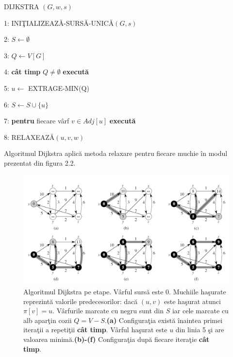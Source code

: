 \documentclass[11pt,a4paper]{report}
\begin{document}
    
    \vspace{0.3cm}
    DIJKSTRA $(G,w,s)$
    
    \vspace{0.1cm}
    1: INI\c TIALIZEAZ\u A-SURS\u A-UNIC\u A$(G,s)$
    
    2: $S\longleftarrow \emptyset$  
    
    3: $Q\longleftarrow V[G]$
    
    4: \textbf{c\^ at timp} $Q\ne \emptyset$ \textbf{execut\u a}
    
    5:\hspace{0.6cm} $u\longleftarrow$ EXTRAGE-MIN(Q)
    
    6:\hspace{0.6cm} $S\longleftarrow S\cup \{u\}$
    
    7:\hspace{0.6cm} \textbf{pentru} fiecare v\^ arf $v\in Adj[u]$ \textbf{execut\u a}
    
    8:\hspace{1.2cm} RELAXEAZ\u A$(u,v,w)$
    \vspace{0.3cm}
    
    Algoritmul Dijkstra aplic\u a metoda relaxare pentru fiecare muchie \^ in modul prezentat din figura 2.2.
    \begin{figure}[!hbt]
    	\centering
    	\includegraphics[width=13.2cm]{Dijkstra.png}
    	\caption{Algoritmul Dijkstra pe etape. V\^ arful surs\u a este 0. Muchiile ha\c surate reprezint\u a valorile predecesorilor: dac\u a $(u,v)$ este ha\c surat atunci $\pi[v]=u$. V\^ arfurile marcate cu negru sunt din $S$ iar cele marcate cu alb apar\c tin cozii $Q=V-S$.\textbf{(a)} Configura\c tia exist\u a \^ inaintea primei itera\c tii a repeti\c tii \textbf{c\^ at timp}. V\^ arful ha\c surat este $u$ din linia 5 \c si are valoarea minim\u a.\textbf{(b)-(f)} Configura\c tia dup\u a fiecare itera\c tie \textbf{c\^ at timp}.}
    \end{figure}
\end{document}
